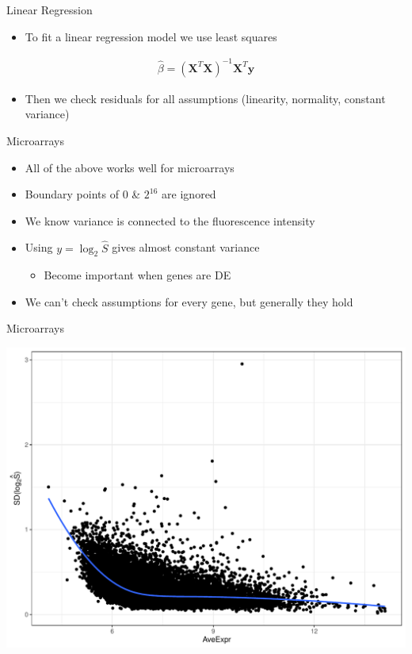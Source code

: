 \documentclass[aspectratio=169,11pt]{beamer}
\begin{document}
\begin{frame}{Linear Regression}

	\begin{itemize}
		\item To fit a linear regression model we use least squares
	\end{itemize}
	\begin{align*}
	\hat{\beta} = ( \mathbf{X}^T \mathbf{X} )^{-1} \mathbf{X}^T\mathbf{y}
	\end{align*}
	\begin{itemize}
		\item Then we check residuals for all assumptions (linearity, normality, constant variance)
	\end{itemize}
	
\end{frame}

\begin{frame}{Microarrays}

	\begin{itemize}
		\item All of the above works well for microarrays
		\item Boundary points of 0 \& $2^{16}$ are ignored
		\item We know variance is connected to the fluorescence intensity
		\item Using $y = \log_2\hat{S}$ gives almost constant variance
		\begin{itemize}
			\item Become important when genes are DE
		\end{itemize}
		\item We can't check assumptions for every gene, but generally they hold
	\end{itemize}

\end{frame}

\begin{frame}{Microarrays}

	\begin{center}
	\includegraphics[scale=0.35]{figures/AvSD.pdf} 
	\end{center}

\end{frame}
\end{document}
